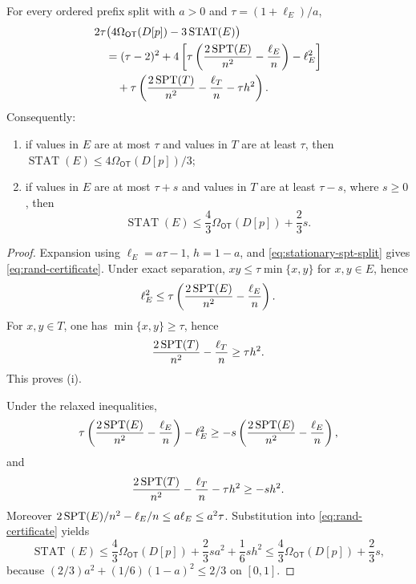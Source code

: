 \begin{lemma}
\label{lem:rand-four-thirds-certificate}
For every ordered prefix split with $a>0$ and
$\tau=(1+\ell_E)/a$,
\begin{equation}
 \begin{aligned}
  &2\tau\bigl(
     4\Omega_{\mathsf{OT}}(D[p])-3\operatorname{STAT}(E)\bigr)\\
  &\quad=(\tau-2)^2
   +4\left[\tau\left(
      \frac{2\operatorname{SPT}(E)}{n^2}-\frac{\ell_E}{n}\right)-\ell_E^2\right]\\
  &\qquad
   +\tau\left(
      \frac{2\operatorname{SPT}(T)}{n^2}-\frac{\ell_T}{n}-\tau h^2\right).
 \end{aligned}
 \label{eq:rand-certificate}
\end{equation}
Consequently:
\begin{enumerate}[label=\textup{(\roman*)}]
\item if values in $E$ are at most $\tau$ and values in $T$ are at least
      $\tau$, then $\operatorname{STAT}(E)\le4\Omega_{\mathsf{OT}}(D[p])/3$;
\item if values in $E$ are at most $\tau+s$ and values in $T$ are at least
      $\tau-s$, where $s\ge0$, then
      \begin{equation}
       \operatorname{STAT}(E)\le\frac43\Omega_{\mathsf{OT}}(D[p])+\frac23s.
       \label{eq:rand-robust-certificate}
      \end{equation}
\end{enumerate}
\end{lemma}

\begin{proof}
Expansion using $\ell_E=a\tau-1$, $h=1-a$, and
\cref{eq:stationary-spt-split} gives \cref{eq:rand-certificate}.  Under exact
separation, $xy\le\tau\min\{x,y\}$ for $x,y\in E$, hence
\[
 \ell_E^2\le\tau\left(
  \frac{2\operatorname{SPT}(E)}{n^2}-\frac{\ell_E}{n}\right).
\]
For $x,y\in T$, one has $\min\{x,y\}\ge\tau$, hence
\[
 \frac{2\operatorname{SPT}(T)}{n^2}-\frac{\ell_T}{n}\ge\tau h^2.
\]
This proves (i).

Under the relaxed inequalities,
\[
 \tau\left(\frac{2\operatorname{SPT}(E)}{n^2}-\frac{\ell_E}{n}\right)-\ell_E^2
 \ge-s\left(\frac{2\operatorname{SPT}(E)}{n^2}-\frac{\ell_E}{n}\right),
\]
and
\[
 \frac{2\operatorname{SPT}(T)}{n^2}-\frac{\ell_T}{n}-\tau h^2\ge-sh^2.
\]
Moreover
$2\operatorname{SPT}(E)/n^2-\ell_E/n\le a\ell_E\le a^2\tau$.
Substitution into
\cref{eq:rand-certificate} yields
\[
 \operatorname{STAT}(E)
 \le\frac43\Omega_{\mathsf{OT}}(D[p])+\frac23sa^2+\frac16sh^2
 \le\frac43\Omega_{\mathsf{OT}}(D[p])+\frac23s,
\]
because $(2/3)a^2+(1/6)(1-a)^2\le2/3$ on $[0,1]$.
\end{proof}

